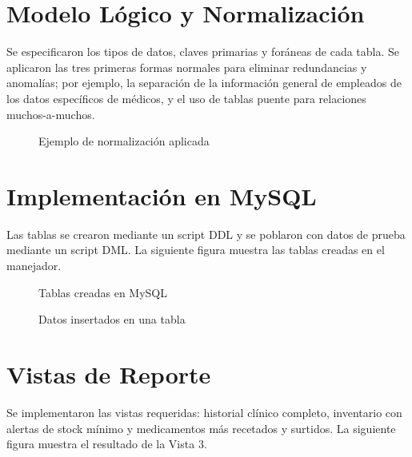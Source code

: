 \documentclass[stu,12pt,floatsintext]{apa7}
\begin{document}
\section{Modelo Lógico y Normalización}
Se especificaron los tipos de datos, claves primarias y foráneas de cada tabla.
Se aplicaron las tres primeras formas normales para eliminar redundancias y
anomalías; por ejemplo, la separación de la información general de empleados de
los datos específicos de médicos, y el uso de tablas puente para relaciones
muchos-a-muchos.

\begin{figure}
    \caption{Ejemplo de normalización aplicada}
    \centering
    \label{fig:norm}
\end{figure}

\section{Implementación en MySQL}
Las tablas se crearon mediante un script DDL y se poblaron con datos de prueba
mediante un script DML. La siguiente figura muestra las tablas creadas en el
manejador.

\begin{figure}
    \caption{Tablas creadas en MySQL}
    \centering
    \label{fig:tablas}
\end{figure}

\begin{figure}
    \caption{Datos insertados en una tabla}
    \centering
    \label{fig:datos}
\end{figure}

\section{Vistas de Reporte}
Se implementaron las vistas requeridas: historial clínico completo, inventario
con alertas de stock mínimo y medicamentos más recetados y surtidos. La
siguiente figura muestra el resultado de la Vista 3.
\end{document}
